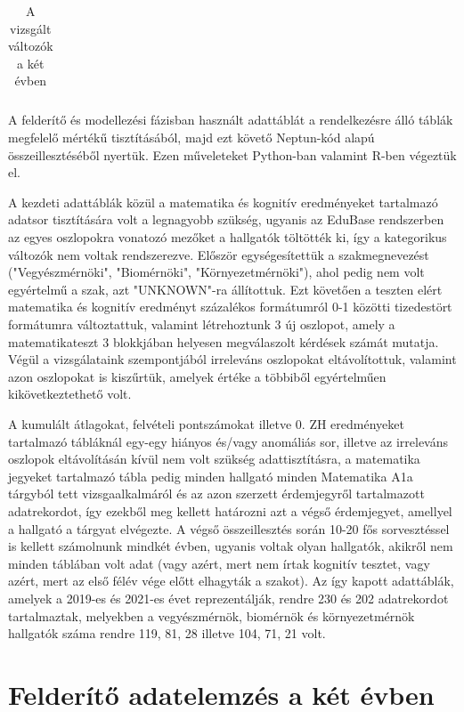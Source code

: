 \documentclass[12pt]{article}
\begin{document}
\begin{table}[H]
\begin{tabular}{|c|c|}
\end{tabular}
\caption{A vizsgált változók a két évben}
\label{tab:valtozok}
\end{table}

A felderítő és modellezési fázisban használt adattáblát a rendelkezésre álló táblák megfelelő mértékű tisztításából, majd ezt követő Neptun-kód alapú összeillesztéséből nyertük. Ezen műveleteket Python-ban valamint R-ben végeztük el.

A kezdeti adattáblák közül a matematika és kognitív eredményeket tartalmazó adatsor tisztítására volt a legnagyobb szükség, ugyanis az EduBase rendszerben az egyes oszlopokra vonatozó mezőket a hallgatók töltötték ki, így a kategorikus változók nem voltak rendszerezve. Először egységesítettük a szakmegnevezést ("Vegyészmérnöki", "Biomérnöki", "Környezetmérnöki"), ahol pedig nem volt egyértelmű a szak, azt "UNKNOWN"-ra állítottuk. Ezt követően a teszten elért matematika és kognitív eredményt százalékos formátumról 0-1 közötti tizedestört formátumra változtattuk, valamint létrehoztunk 3 új oszlopot, amely a matematikateszt 3 blokkjában helyesen megválaszolt kérdések számát mutatja. Végül a vizsgálataink szempontjából irreleváns oszlopokat eltávolítottuk, valamint azon oszlopokat is kiszűrtük, amelyek értéke a többiből egyértelműen kikövetkeztethető volt. 

A kumulált átlagokat, felvételi pontszámokat illetve 0. ZH eredményeket tartalmazó tábláknál egy-egy hiányos és/vagy anomáliás sor, illetve az irreleváns oszlopok eltávolításán kívül nem volt szükség adattisztításra, a matematika jegyeket tartalmazó tábla pedig minden hallgató minden Matematika A1a tárgyból tett vizsgaalkalmáról és az azon szerzett érdemjegyről tartalmazott adatrekordot, így ezekből meg kellett határozni azt a végső érdemjegyet, amellyel a hallgató a tárgyat elvégezte. A végső összeillesztés során 10-20 fős sorvesztéssel is kellett számolnunk mindkét évben, ugyanis voltak olyan hallgatók, akikről nem minden táblában volt adat (vagy azért, mert nem írtak kognitív tesztet, vagy azért, mert az első félév vége előtt elhagyták a szakot). Az így kapott adattáblák, amelyek a 2019-es és 2021-es évet reprezentálják, rendre 230 és 202 adatrekordot tartalmaztak, melyekben a vegyészmérnök, biomérnök és környezetmérnök hallgatók száma rendre 119, 81, 28 illetve 104, 71, 21 volt.

\newpage

\section{Felderítő adatelemzés a két évben}
\end{document}
